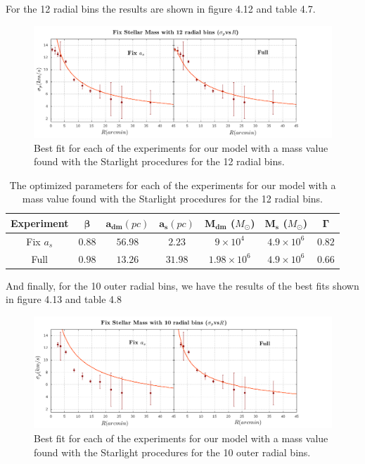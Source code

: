 For the 12 radial bins the results are shown in figure 4.12 and table 4.7.

\begin{figure}[H]
\centering
\includegraphics[width=15cm]{images/Starlight_25_12.png}
\caption[Best fits for our model with a mass value based on the Starlight procedures for the 12 radial bins.]{Best fit for each of the experiments for our model with a mass value found with the Starlight procedures for the 12 radial bins.}
\end{figure}

\begin{table}[H]
\begin{center}
\begin{tabular}{| c| c| c| c| c| c| c|}
    \hline
    \textbf{Experiment} & $\mathbf{\beta}$ & $\mathbf{a_{dm}} (pc)$ & $\mathbf{a_{s}} (pc)$ & $\mathbf{M_{dm}}$ ($M_{\odot}$) & $\mathbf{M_{s}}$ ($M_{\odot}$) & $\mathbf{\Gamma}$\\ \hline
	Fix $a_s$ &	$0.88$ &	$56.98$ &	$2.23$ &	$9 \times 10^{4}$ &	$4.9 \times 10 ^{6}$ &	$0.82$\\ \hline
	Full &	$0.98$ &	$13.26$ &	$31.98$ &	$1.98 \times 10^{6}$ &	$4.9 \times 10^{6}$ &	$0.66$\\ \hline
  \end{tabular} 
\caption[Optimized parameters for our model with a mass value based on the Starlight procedures for the 12 radial bins.]{The optimized parameters for each of the experiments for our model with a mass value found with the Starlight procedures for the 12 radial bins.}
\end{center}
\end{table}

And finally, for the 10 outer radial bins, we have the results of the best fits shown in figure 4.13 and table 4.8

\begin{figure}[H]
\centering
\includegraphics[width=15cm]{images/Starlight_25_10.png}
\caption[Best fits for our model with a mass value based on the Starlight procedures for the 10 outer radial bins.]{Best fit for each of the experiments for our model with a mass value found with the Starlight procedures for the 10 outer radial bins.}
\end{figure}

